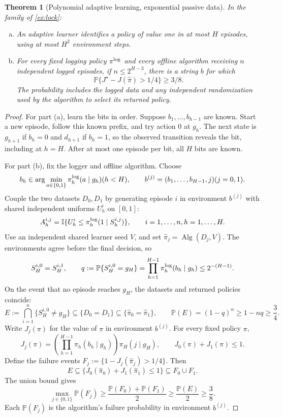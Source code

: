 \documentclass[11pt,twoside]{article}
\newcommand{\I}{\mathbb I}
\renewcommand{\P}{\mathbb P}
\newtheorem{theorem}{Theorem}[section]
\theoremstyle{definition}
\theoremstyle{remark}
\begin{document}
\begin{theorem}[Polynomial adaptive learning, exponential passive data]
\label{thm:lock}
In the family of \cref{ex:lock}:
\begin{enumerate}[(a),leftmargin=*]
\item An adaptive learner identifies a policy of value one in at most $H$
episodes, using at most $H^2$ environment steps.
\item For every fixed logging policy $\pi^{\rm log}$ and every offline
algorithm receiving $n$ independent logged episodes, if $n\le2^{H-3}$,
there is a string $b$ for which
\[
 \P\{J^\star-J(\widehat\pi)>1/4\}\ge3/8.
\]
The probability includes the logged data and any independent randomization
used by the algorithm to select its returned policy.
\end{enumerate}
\end{theorem}

\begin{proof}
For part (a), learn the bits in order. Suppose $b_1,\ldots,b_{h-1}$ are
known. Start a new episode, follow this known prefix, and try action $0$
at $g_h$. The next state is $g_{h+1}$ if $b_h=0$ and $d_{h+1}$ if
$b_h=1$, so the observed transition reveals the bit, including at $h=H$.
After at most one episode per bit, all $H$ bits are known.

For part (b), fix the logger and offline algorithm. Choose
\[
 b_h\in\arg\min_{a\in\{0,1\}}\pi_h^{\rm log}(a\mid g_h)
 \quad(h<H),
 \qquad b^{(j)}=(b_1,\ldots,b_{H-1},j)\quad(j=0,1).
\]
Couple the two datasets $D_0,D_1$ by generating episode $i$ in environment
$b^{(j)}$ with shared independent uniforms $U_h^i$ on $[0,1]$:
\[
 A_h^{i,j}=\I\{U_h^i\le\pi_h^{\rm log}(1\mid S_h^{i,j})\},
 \qquad i=1,\ldots,n,\quad h=1,\ldots,H.
\]
Use an independent shared learner seed $V$, and set
$\widehat\pi_j=\operatorname{Alg}(D_j,V)$.
The environments agree before the final decision, so
\[
 S_H^{i,0}=S_H^{i,1},
 \qquad
 q:=\P\{S_H^{i,0}=g_H\}
 =\prod_{h=1}^{H-1}\pi_h^{\rm log}(b_h\mid g_h)\le2^{-(H-1)}.
\]
On the event that no episode reaches $g_H$, the datasets and returned
policies coincide:
\[
 E:=\bigcap_{i=1}^n\{S_H^{i,0}\ne g_H\}
 \subseteq\{D_0=D_1\}
 \subseteq\{\widehat\pi_0=\widehat\pi_1\},
 \qquad
 \P(E)=(1-q)^n\ge1-nq\ge\frac34.
\]
Write $J_j(\pi)$ for the value of $\pi$ in environment $b^{(j)}$.
For every fixed policy $\pi$,
\[
 J_j(\pi)=\left(\prod_{h=1}^{H-1}\pi_h(b_h\mid g_h)\right)
          \pi_H(j\mid g_H),
 \qquad J_0(\pi)+J_1(\pi)\le1.
\]
Define the failure events $F_j:=\{1-J_j(\widehat\pi_j)>1/4\}$. Then
\[
 E\subseteq\{J_0(\widehat\pi_0)+J_1(\widehat\pi_1)\le1\}
 \subseteq F_0\cup F_1.
\]
The union bound gives
\[
 \max_{j\in\{0,1\}}\P(F_j)
 \ge\frac{\P(F_0)+\P(F_1)}2
 \ge\frac{\P(E)}2\ge\frac38.
\]
Each $\P(F_j)$ is the algorithm's failure probability in environment
$b^{(j)}$.
\end{proof}
\end{document}
